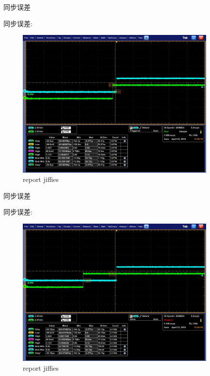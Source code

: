 \begin{frame}[fragile]{同步误差}

同步误差:

  \begin{figure}[htbp]
  \begin{center}
  \includegraphics[width=10cm]{img/mis1}
  \caption{report jiffies}
  \label{report}
  \end{center}
  \vspace{-0.5em}
  \end{figure}


\end{frame}
\begin{frame}[fragile]{同步误差}

同步误差:

  \begin{figure}[htbp]
  \begin{center}
  \includegraphics[width=10cm]{img/mis2}
  \caption{report jiffies}
  \label{report}
  \end{center}
  \vspace{-0.5em}
  \end{figure}


\end{frame}

